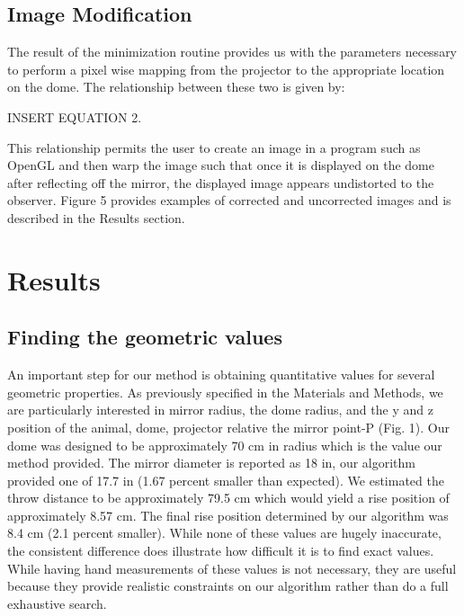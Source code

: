 \documentclass[10pt,letterpaper]{article}
\begin{document}
\subsection*{Image Modification}

The result of the minimization routine provides us with the parameters
necessary to perform a pixel wise mapping from the projector to the appropriate
location on the dome.  The relationship between these two is given by:

INSERT EQUATION 2.

This relationship permits the user to create an image in a program such as
OpenGL and then warp the image such that once it is displayed on the dome after
reflecting off the mirror, the displayed image appears undistorted to the
observer. Figure 5 provides examples of corrected and uncorrected images and is
described in the Results section. 


%

\section*{Results}

\subsection*{Finding the geometric values}

An important step for our method is obtaining quantitative values for several
geometric properties. As previously specified in the Materials and Methods, we
are particularly interested in mirror radius, the dome radius, and the y and z
position of the animal, dome, projector relative the mirror point-P (Fig. 1).
Our dome was designed to be approximately 70 cm in radius which is the value
our method provided. The mirror diameter is reported as 18 in, our algorithm
provided one of 17.7 in (1.67 percent smaller than expected). We estimated the
throw distance to be approximately 79.5 cm which would yield a rise position of
approximately 8.57 cm. The final rise position determined by our algorithm was
8.4 cm (2.1 percent smaller). While none of these values are hugely inaccurate,
the consistent difference does illustrate how difficult it is to find exact
values. While having hand measurements of these values is not necessary, they
are useful because they provide realistic constraints on our algorithm rather
than do a full exhaustive search. 
\end{document}
